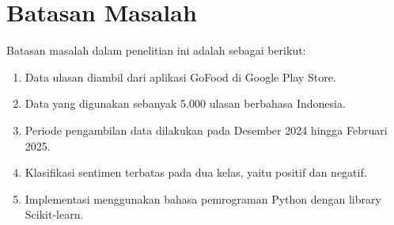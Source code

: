 \section{Batasan Masalah}

Batasan masalah dalam penelitian ini adalah sebagai berikut:

\begin{enumerate}
  \item Data ulasan diambil dari aplikasi GoFood di Google Play Store.
  \item Data yang digunakan sebanyak 5.000 ulasan berbahasa Indonesia.
  \item Periode pengambilan data dilakukan pada Desember 2024 hingga Februari 2025.
  \item Klasifikasi sentimen terbatas pada dua kelas, yaitu positif dan negatif.
  \item Implementasi menggunakan bahasa pemrograman Python dengan library Scikit-learn.
\end{enumerate}
